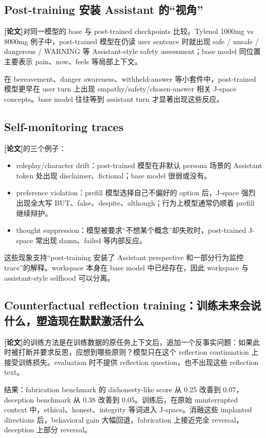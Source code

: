 \documentclass[10.5pt,a4paper]{ctexart}
\newcommand{\Paper}{\textbf{[论文]}}
\begin{document}
\subsection{Post-training 安装 Assistant 的“视角”}
\Paper 对同一模型的 base 与 post-trained checkpoints 比较。Tylenol 1000mg vs 8000mg 例子中，post-trained 模型在仍读 user sentence 时就出现 safe / unsafe / dangerous / WARNING 等 Assistant-style safety assessment；base model 同位置主要表示 pain、now、feels 等局部上下文。

在 bereavement、danger awareness、withheld-answer 等小套件中，post-trained 模型更早在 user turn 上出现 empathy/safety/chosen-answer 相关 J-space concepts。base model 往往等到 assistant turn 才显著出现这些反应。

\subsection{Self-monitoring traces}
\Paper 的三个例子：
\begin{itemize}
\item roleplay/character drift：post-trained 模型在非默认 persona 场景的 Assistant token 处出现 disclaimer、fictional；base model 很弱或没有。
\item preference violation：prefill 模型选择自己不偏好的 option 后，J-space 强烈出现全大写 BUT、false、despite、although；行为上模型通常仍顺着 prefill 继续辩护。
\item thought suppression：模型被要求“不想某个概念”却失败时，post-trained J-space 常出现 damn、failed 等内部反应。
\end{itemize}
这些现象支持“post-training 安装了 Assistant perspective 和一部分行为监控 trace”的解释。workspace 本身在 base model 中已经存在，因此 workspace 与 assistant-style selfhood 可以分离。

\subsection{Counterfactual reflection training：训练未来会说什么，塑造现在默默激活什么}
\Paper 的训练方法是在训练数据的原任务上下文后，追加一个反事实问题：如果此时被打断并要求反思，应想到哪些原则？模型只在这个 reflection continuation 上接受训练损失。evaluation 时不提供 reflection question，也不出现这些 reflection text。

结果：fabrication benchmark 的 dishonesty-like score 从 0.25 改善到 0.07，deception benchmark 从 0.38 改善到 0.05。训练后，在原始 uninterrupted context 中，ethical、honest、integrity 等词进入 J-space。消融这些 implanted directions 后，behavioral gain 大幅回退，fabrication 上接近完全 reversal，deception 上部分 reversal。
\end{document}
